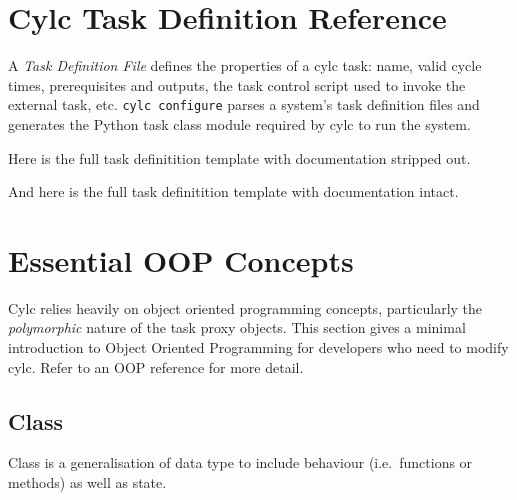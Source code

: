\documentclass[11pt,a4paper]{article}
\begin{document}
\pagebreak
\section{Cylc Task Definition Reference}

A {\em Task Definition File} defines the properties of a cylc task:
name, valid cycle times, prerequisites and outputs, the task
control script used to invoke the external task, etc.  
\verb=cylc configure= parses a system's task definition files and
generates the Python task class module required by cylc to run the
system.

Here is the full task definitition template with documentation stripped
out.

{
\color{Brown}

}

\pagebreak

And here is the full task definitition template with documentation intact.

{
\color{Brown}

}



\pagebreak
\appendix

\section{Essential OOP Concepts}

Cylc relies heavily on object oriented programming concepts,
particularly the {\em polymorphic} nature of the task proxy objects.
This section gives a minimal introduction to Object Oriented
Programming for developers who need to modify cylc. Refer to an OOP
reference for more detail.

\subsection{Class}

Class is a generalisation of data type to include behaviour (i.e.\
functions or methods) as well as state. 

\end{document}
